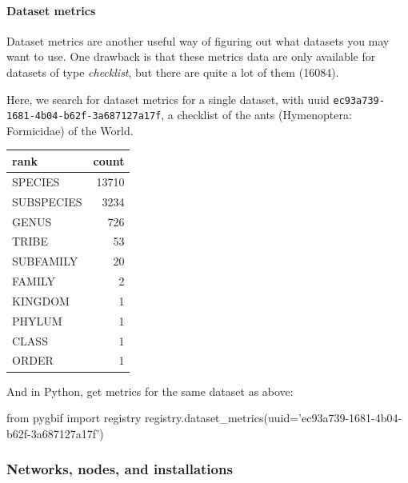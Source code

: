 \documentclass[author-year, review, 11pt]{components/elsarticle} %
\newenvironment{Shaded}{\begin{snugshade}}{\end{snugshade}}
\newcommand{\KeywordTok}[1]{\textcolor[rgb]{0.13,0.29,0.53}{\textbf{{#1}}}}
\newcommand{\DataTypeTok}[1]{\textcolor[rgb]{0.13,0.29,0.53}{{#1}}}
\newcommand{\CharTok}[1]{\textcolor[rgb]{0.31,0.60,0.02}{{#1}}}
\newcommand{\StringTok}[1]{\textcolor[rgb]{0.31,0.60,0.02}{{#1}}}
\newcommand{\NormalTok}[1]{{#1}}
\begin{document}
\paragraph{Dataset metrics}\label{dataset-metrics}

Dataset metrics are another useful way of figuring out what datasets you
may want to use. One drawback is that these metrics data are only
available for datasets of type \emph{checklist}, but there are quite a
lot of them (16084).

Here, we search for dataset metrics for a single dataset, with uuid
\texttt{ec93a739-1681-4b04-b62f-3a687127a17f}, a checklist of the ants
(Hymenoptera: Formicidae) of the World.

\begin{Shaded}
\end{Shaded}

\begin{longtable}[c]{@{}lr@{}}
\toprule
rank & count\tabularnewline
\midrule
\endhead
SPECIES & 13710\tabularnewline
SUBSPECIES & 3234\tabularnewline
GENUS & 726\tabularnewline
TRIBE & 53\tabularnewline
SUBFAMILY & 20\tabularnewline
FAMILY & 2\tabularnewline
KINGDOM & 1\tabularnewline
PHYLUM & 1\tabularnewline
CLASS & 1\tabularnewline
ORDER & 1\tabularnewline
\bottomrule
\end{longtable}

And in Python, get metrics for the same dataset as above:

\begin{Shaded}
\begin{Highlighting}[]
\CharTok{from} \NormalTok{pygbif }\CharTok{import} \NormalTok{registry}
\NormalTok{registry.dataset_metrics(uuid=}\StringTok{'ec93a739-1681-4b04-b62f-3a687127a17f'}\NormalTok{)}
\end{Highlighting}
\end{Shaded}

\subsubsection{Networks, nodes, and
installations}\label{networks-nodes-and-installations}
\end{document}
